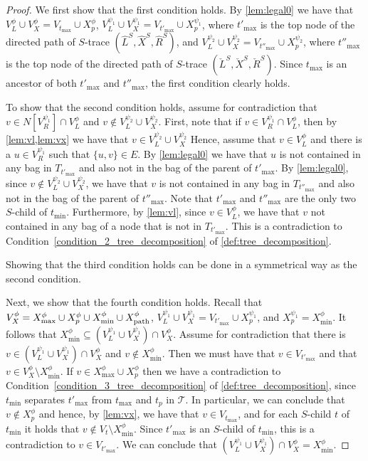\documentclass[a4paper,UKenglish,cleveref, autoref, thm-restate, numberwithinsect]{lipics-v2021}
\newcommand{\dpath}{\textup{path}}
\begin{document}
\begin{proof}
We first show that the first condition holds. By \cref{lem:legal0} we have that $V^\phi_L\cup V^\phi_X=V_{t_{\max}}\cup X^\phi_p$, $V^{\psi_1}_L\cup V^{\psi_1}_X=V_{t'_{\max}}\cup X^{\psi_1}_p$, where $t'_{\max}$ is the top node of the directed path of $S$-trace $(\hat{L}^S, \hat{X}^S, \hat{R}^S)$, and $V^{\psi_2}_L\cup V^{\psi_2}_X=V_{t''_{\max}}\cup X^{\psi_2}_p$, where $t''_{\max}$ is the top node of the directed path of $S$-trace $(\check{L}^S, \check{X}^S, \check{R}^S)$. 
Since $t_{\max}$ is an ancestor of both $t'_{\max}$ and $t''_{\max}$, the first condition clearly holds.


To show that the second condition holds, assume for contradiction that $v\in N[V^{\psi_1}_R]\cap V^\phi_L$ and $v\notin V^{\psi_2}_L\cup V^{\psi_2}_X$. 
First, note that if $v\in V^{\psi_1}_R\cap V^\phi_L$, then by \cref{lem:vl,lem:vx} we have that $v\in V^{\psi_2}_L\cup V^{\psi_2}_X$
Hence, assume that $v\in V^\phi_L$ and there is a $u\in V^{\psi_1}_R$ such that $\{u,v\}\in E$. By \cref{lem:legal0} we have that $u$ is not contained in any bag in $T_{t'_{\max}}$ and also not in the bag of the parent of $t'_{\max}$.  
By \cref{lem:legal0}, since $v\notin V^{\psi_2}_L\cup V^{\psi_2}_X$, we have that $v$ is not contained in any bag in $T_{t''_{\max}}$ and also not in the bag of the parent of $t''_{\max}$. 
Note that $t'_{\max}$ and $t''_{\max}$ are the only two $S$-child of $t_{\min}$.
Furthermore, by \cref{lem:vl}, since $v\in V^\phi_L$, we have that $v$ not contained in any bag of a node that is not in $T_{t'_{\max}}$. 
This is a contradiction to Condition~\ref{condition_2_tree_decomposition} of \cref{def:tree_decomposition}.

Showing that the third condition holds can be done in a symmetrical way as the second condition.

Next, we show that the fourth condition holds. Recall that $V^\phi_X=X^\phi_{\max}\cup X^\phi_p\cup X^\phi_{\min}\cup X^\phi_{\dpath}$, $V^{\psi_1}_L\cup V^{\psi_1}_X=V_{t'_{\max}}\cup X^{\psi_1}_p$, and $X^{\psi_1}_p=X^\phi_{\min}$. It follows that $X^\phi_{\min}\subseteq (V^{\psi_1}_L\cup V^{\psi_1}_X)\cap V^\phi_X$.
Assume for contradiction that there is $v\in (V^{\psi_1}_L\cup V^{\psi_1}_X)\cap V^\phi_X$ and $v\notin X^\phi_{\min}$. 
Then we must have that $v\in V_{t'_{\max}}$ and that $v\in V^\phi_X\setminus X^\phi_{\min}$. 
If $v\in X^\phi_{\max}\cup X^\phi_p$ then we have a contradiction to Condition~\ref{condition_3_tree_decomposition} of \cref{def:tree_decomposition}, since $t_{\min}$ separates $t'_{\max}$ from $t_{\max}$ and $t_p$ in $\mathcal{T}$. 
In particular, we can conclude that $v\notin X^\phi_p$ and hence, by \cref{lem:vx}, we have that $v\in V_{t_{\max}}$, and for each $S$-child $t$ of $t_{\min}$ it holds that $v\notin V_t\setminus X^\phi_{\min}$. Since $t'_{\max}$ is an $S$-child of $t_{\min}$, this is a contradiction to $v\in V_{t'_{\max}}$.
We can conclude that $(V^{\psi_1}_L\cup V^{\psi_1}_X)\cap V^\phi_X= X^\phi_{\min}$.


\end{proof}
\end{document}
